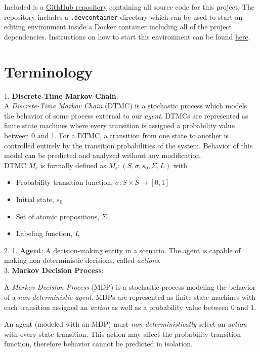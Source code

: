 \documentclass{article}
\begin{document}
Included is a \href{https://github.com/chuckdud/COMS412-Final-Project}{GithHub repository} containing all source code for this project. The repository includes a \texttt{.devcontainer} directory which can be used to start an editing environment inside a Docker container including all of the project dependencies. Instructions on how to start this environment can be found \href{https://code.visualstudio.com/docs/devcontainers/containers}{here}.

\section{Terminology}
1. \textbf{Discrete-Time Markov Chain}: \\

A \textit{Discrete-Time Markov Chain} (DTMC) is a stochastic process which models the behavior of some process external to our \textit{agent}. DTMCs are represented as finite state machines where every transition is assigned a probability value between 0 and 1. For a DTMC, a transition from one state to another is controlled entirely by the transition probabilities of the system. Behavior of this model can be predicted and analyzed without any modification. \\

DTMC $M_c$ is formally defined as $M_c: (S, \sigma, s_0, \Sigma, L)$ with 
\begin{itemize}
    \setlength\itemsep{0em}
    \item Probability transition function, $\sigma: S \times S \rightarrow [0, 1]$
    \item Initial state, $s_0$
    \item Set of atomic propositions, $\Sigma$
    \item Labeling function, $L$
\end{itemize}

2. 1. \textbf{Agent}: A decision-making entity in a scenario. The agent is capable of making non-deterministic decisions, called \textit{actions}.\\

3. \textbf{Markov Decision Process}:

A \textit{Markov Decision Process} (MDP) is a stochastic process modeling the behavior of a \textit{non-deterministic agent}. MDPs are represented as finite state machines with each transition assigned an \textit{action} as well as a probability value between 0 and 1. 

An agent (modeled with an MDP) must \textit{non-deterministically} select an \textit{action} with every state transition. This action may affect the probability transition function, therefore behavior cannot be predicted in isolation.
\end{document}
